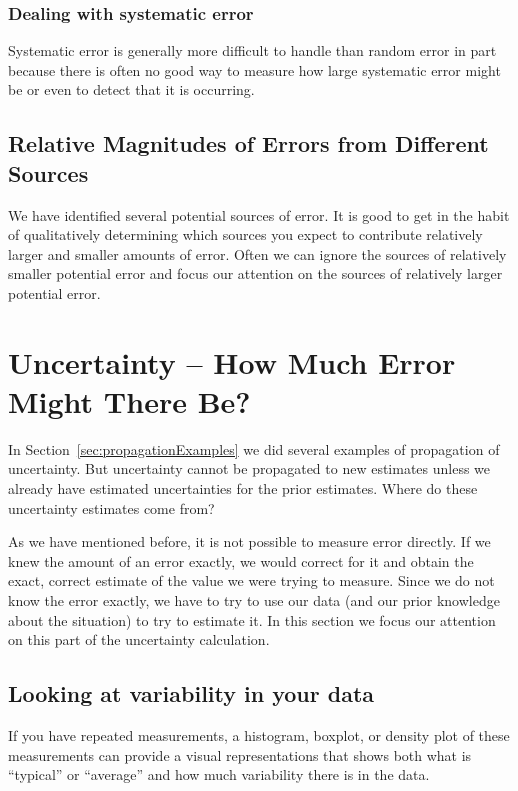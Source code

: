 \documentclass[twoside]{book}\usepackage[]{graphicx}\usepackage[]{xcolor}
\newcounter{example}[section]
\begin{document}
\subsubsection{Dealing with systematic error}
Systematic error is generally more difficult to handle than random error in
part because there is often no good way to measure how large systematic error
might be or even to detect that it is occurring.

\subsection{Relative Magnitudes of Errors from Different Sources}

We have identified several potential sources of error.  
It is good to get in the habit of qualitatively determining which sources you expect to contribute
relatively larger and smaller amounts of error.  Often we can ignore the sources of relatively
smaller potential error and focus our attention on the sources of relatively larger potential
error.


\section{Uncertainty -- How Much Error Might There Be?}

In Section~\ref{sec:propagationExamples} we did several examples of propagation of 
uncertainty.  But uncertainty cannot be propagated to new estimates unless we already
have estimated uncertainties for the prior estimates.  Where do these uncertainty estimates 
come from?

As we have mentioned before, it is not possible to measure error directly.  
If we knew the amount of an error exactly, we would correct for it and obtain the exact, correct estimate of the value we were trying to measure.  
Since we do not know the error exactly, we have to try to use our data (and our prior knowledge about the situation) to try to estimate it. In this section we focus 
our attention on this part of the uncertainty calculation.

\subsection{Looking at variability in your data}

If you have repeated measurements, a histogram, boxplot, or density plot of these 
measurements can provide a 
visual representations that shows both what is ``typical'' or ``average'' and how much 
variability there is in the data.  
\end{document}
